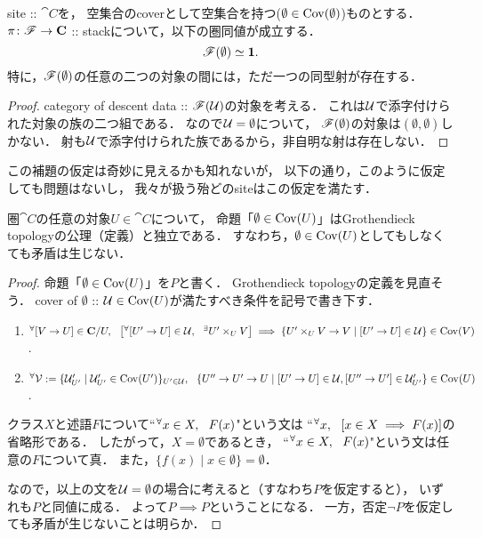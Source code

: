 \documentclass[a4paper]{jsarticle}
\begin{document}
\begin{Lemma}
    site :: $\cat{C}$を，
    空集合のcoverとして空集合を持つ($\emptyset \in \operatorname{Cov}(\emptyset)$)ものとする．
    $\pi \colon \mathscr{F} \to \mathbf{C}$ :: stackについて，以下の圏同値が成立する．
    \[ \mathscr{F}( \emptyset ) \simeq \mathbf{1}. \]
    特に，$\mathscr{F}(\emptyset)$の任意の二つの対象の間には，ただ一つの同型射が存在する．
\end{Lemma}
\begin{proof}
    category of descent data :: $\mathscr{F}(\mathcal{U})$の対象を考える．
    これは$\mathcal{U}$で添字付けられた対象の族の二つ組である．
    なので$\mathcal{U}=\emptyset$について，
    $\mathscr{F}(\emptyset)$の対象は$(\emptyset, \emptyset)$しかない．
    射も$\mathcal{U}$で添字付けられた族であるから，非自明な射は存在しない．
\end{proof}

この補題の仮定は奇妙に見えるかも知れないが，
以下の通り，このように仮定しても問題はないし，
我々が扱う殆どのsiteはこの仮定を満たす．

\begin{Claim}
    圏$\cat{C}$の任意の対象$U \in \cat{C}$について，
    命題「$\emptyset \in \operatorname{Cov}(U)$」はGrothendieck topologyの公理（定義）と独立である．
    すなわち，$\emptyset \in \operatorname{Cov}(U)$としてもしなくても矛盾は生じない．
\end{Claim}
\begin{proof}
    命題「$\emptyset \in \operatorname{Cov}(U)$」を$P$と書く．
    Grothendieck topologyの定義を見直そう．
    cover of $\emptyset$ :: $\mathcal{U} \in \operatorname{Cov}(U)$が満たすべき条件を記号で書き下す．
    \begin{enumerate}[label=(\alph*)]
        \item
            ${}^{\forall} [V \to U] \in \mathbf{C}/U,~~
            \left[ {}^{\forall} [U' \to U] \in \mathcal{U},~~ {}^{\exists} U' \times_{U} V \right]
            \implies \{ U' \times_{U} V \to V \mid [U' \to U] \in \mathcal{U} \} \in \operatorname{Cov}(V)$.

        \item ${}^{\forall} \mathcal{V}:=\{ \mathcal{U}'_{U'} \mid \mathcal{U}'_{U'} \in \operatorname{Cov}(U')\}_{U' \in \mathcal{U}},~~
                \{ U'' \to U' \to U \mid
                    [U' \to U] \in \mathcal{U}, [U'' \to U'] \in \mathcal{U}'_{U'} \} \in \operatorname{Cov}(U)$.
    \end{enumerate}
    クラス$X$と述語$F$について``${}^{\forall} x \in X,~~ F(x)$"という文は
    ``${}^{\forall} x,~~ \left[x \in X \implies F(x)\right]$の省略形である．
    したがって，$X=\emptyset$であるとき，
    ``${}^{\forall} x \in X,~~ F(x)$"という文は任意の$F$について真．
    また，$\{ f(x) \mid x \in \emptyset \}=\emptyset$．

    なので，以上の文を$\mathcal{U}=\emptyset$の場合に考えると（すなわち$P$を仮定すると），
    いずれも$P$と同値に成る．
    よって$P \implies P$ということになる．
    一方，否定$\lnot P$を仮定しても矛盾が生じないことは明らか．
\end{proof}
\end{document}
